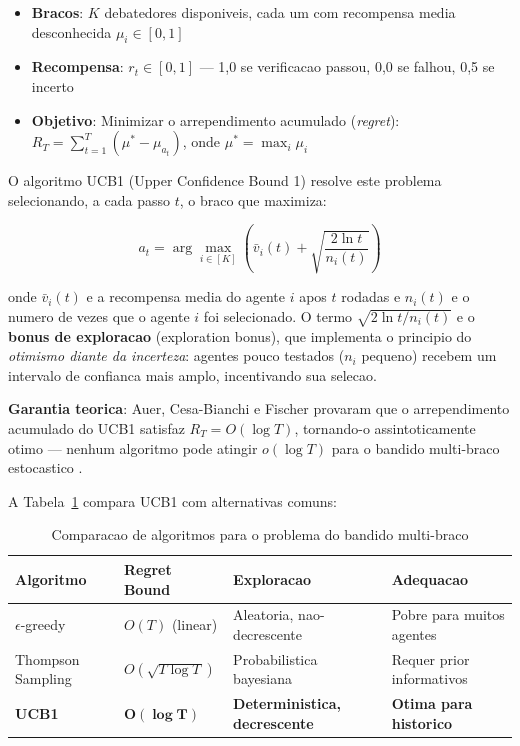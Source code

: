\documentclass[5p]{elsarticle}
\begin{document}
\begin{itemize}
  \item \textbf{Bracos}: $K$ debatedores disponiveis, cada um com recompensa media desconhecida $\mu_i \in [0,1]$
  \item \textbf{Recompensa}: $r_t \in [0,1]$ --- 1,0 se verificacao passou, 0,0 se falhou, 0,5 se incerto
  \item \textbf{Objetivo}: Minimizar o arrependimento acumulado (\textit{regret}): $R_T = \sum_{t=1}^T (\mu^* - \mu_{a_t})$, onde $\mu^* = \max_i \mu_i$
\end{itemize}

O algoritmo UCB1 (Upper Confidence Bound 1) \cite{auer2002} resolve este problema selecionando, a cada passo $t$, o braco que maximiza:

\begin{equation}\label{eq:ucb1}
  a_t = \arg\max_{i \in [K]} \left( \bar{v}_i(t) +
    \sqrt{\frac{2 \ln t}{n_i(t)}} \right)
\end{equation}

onde $\bar{v}_i(t)$ e a recompensa media do agente $i$ apos $t$ rodadas e $n_i(t)$ e o numero de vezes que o agente $i$ foi selecionado. O termo $\sqrt{2\ln t / n_i(t)}$ e o \textbf{bonus de exploracao} (exploration bonus), que implementa o principio do \textit{otimismo diante da incerteza}: agentes pouco testados ($n_i$ pequeno) recebem um intervalo de confianca mais amplo, incentivando sua selecao.

\textbf{Garantia teorica}: Auer, Cesa-Bianchi e Fischer \cite{auer2002} provaram que o arrependimento acumulado do UCB1 satisfaz $R_T = O(\log T)$, tornando-o assintoticamente otimo --- nenhum algoritmo pode atingir $o(\log T)$ para o bandido multi-braco estocastico \cite{lai1985}.

A Tabela~\ref{tab:bandit-compare} compara UCB1 com alternativas comuns:

\begin{table}[H]
  \centering
  \caption{Comparacao de algoritmos para o problema do bandido multi-braco}
  \label{tab:bandit-compare}
  \begin{tabular}{llll}
    \toprule
    \textbf{Algoritmo} & \textbf{Regret Bound} & \textbf{Exploracao} & \textbf{Adequacao} \\
    \midrule
    $\epsilon$-greedy & $O(T)$ (linear) & Aleatoria, nao-decrescente & Pobre para muitos agentes \\
    Thompson Sampling & $O(\sqrt{T \log T})$ & Probabilistica bayesiana & Requer prior informativos \\
    \textbf{UCB1} & $\mathbf{O(\log T)}$ & \textbf{Deterministica, decrescente} & \textbf{Otima para historico} \\
    \bottomrule
  \end{tabular}
\end{table}
\end{document}
